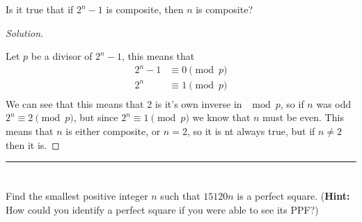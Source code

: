 \documentclass[11pt]{article}
\newcommand{\bline}{\noindent\rule[0.5ex]{\linewidth}{1pt}}
\newenvironment{problem}[2][Problem]{\begin{trivlist}
\item[\hskip \labelsep {\bfseries #1}\hskip \labelsep {\bfseries #2.}]}{\end{trivlist}}
\newenvironment{solution}
  {\renewcommand\qedsymbol{$~$}\begin{proof}[Solution]$ $\par\nobreak\ignorespaces}
  {\end{proof}}
\begin{document}
\begin{problem}{15}
Is it true that if $2^n-1$ is composite, then $n$ is composite?
\end{problem}

\begin{solution}
  Let $p$ be a divisor of $2^n-1$, this means that
  \begin{align*}
    2^n-1 & \equiv 0 \pmod{p} \\
    2^n   & \equiv 1 \pmod{p} \\
  \end{align*}
  We can see that this means that 2 is it's own inverse in $\mod{p}$, so if $n$ was odd $2^n\equiv 2\pmod{p}$, but since $2^n\equiv 1 \pmod{p}$ we know that $n$ must be even. This means that $n$ is either composite, or $n=2$, so it is nt always true, but if $n\neq 2$ then it is.
\end{solution}

\bline

\section{}
\begin{problem}{}
Find the smallest positive integer $n$ such that $15120 n$ is a perfect square. (\textbf{Hint:} How could you identify a perfect square if you were able to see its PPF?)
\end{problem}
\end{document}
